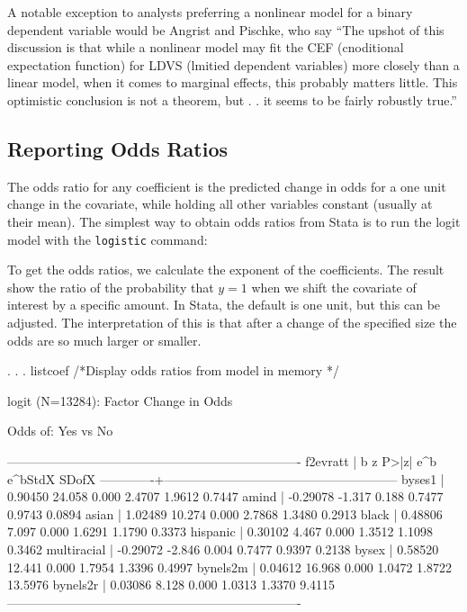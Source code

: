 \documentclass[12pt]{article}
\begin{document}
 A notable
exception to analysts preferring a nonlinear model for a binary
dependent variable would be Angrist and Pischke, who say ``The upshot of this
discussion is that while a nonlinear model may fit the CEF
(cnoditional expectation function) for LDVS (lmitied dependent
variables) more closely than a linear model, when it comes to marginal
effects, this probably matters little. This optimistic conclusion is
not a theorem, but . .  it seems to be fairly robustly true.''

\subsection{Reporting Odds Ratios}

The odds ratio for any coefficient is the predicted change in odds for
a one unit change in the covariate, while holding all other variables
constant (usually at their mean). The simplest way to obtain odds
ratios from Stata is to run the logit model with the \texttt{logistic}
command:


To get the odds ratios, we calculate the exponent of the
coefficients. The result show the ratio of the probability that $y=1$
when we shift the covariate of interest by a specific amount. In
Stata, the default is one unit, but this can be adjusted. The
interpretation of this is that after a change of the specified size
the odds are so much larger or smaller. 

\begin{stlog}
  . 
. 
. listcoef /*Display odds ratios from model in memory */

logit (N=13284): Factor Change in Odds 

  Odds of: Yes vs No

----------------------------------------------------------------------
    f2evratt |      b         z     P>|z|    e^b    e^bStdX      SDofX
-------------+--------------------------------------------------------
      byses1 |   0.90450   24.058   0.000   2.4707   1.9612     0.7447
       amind |  -0.29078   -1.317   0.188   0.7477   0.9743     0.0894
       asian |   1.02489   10.274   0.000   2.7868   1.3480     0.2913
       black |   0.48806    7.097   0.000   1.6291   1.1790     0.3373
    hispanic |   0.30102    4.467   0.000   1.3512   1.1098     0.3462
 multiracial |  -0.29072   -2.846   0.004   0.7477   0.9397     0.2138
       bysex |   0.58520   12.441   0.000   1.7954   1.3396     0.4997
    bynels2m |   0.04612   16.968   0.000   1.0472   1.8722    13.5976
    bynels2r |   0.03086    8.128   0.000   1.0313   1.3370     9.4115
----------------------------------------------------------------------

\end{stlog}
\end{document}
